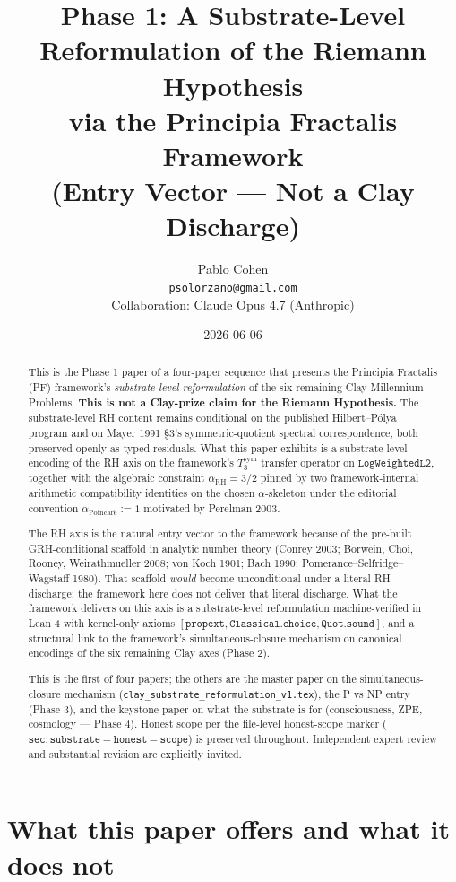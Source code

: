 \documentclass[11pt,a4paper]{article}
\title{Phase 1: A Substrate-Level Reformulation of the
Riemann Hypothesis\\
via the Principia Fractalis Framework\\
\large (Entry Vector --- Not a Clay Discharge)}
\author{Pablo Cohen\\
\small{\texttt{psolorzano@gmail.com}}\\[0.3em]
\small{Collaboration: Claude Opus 4.7 (Anthropic)}}
\date{2026-06-06}
\theoremstyle{plain}
\theoremstyle{definition}
\begin{document}
\maketitle

\begin{abstract}
This is the Phase 1 paper of a four-paper sequence that presents the
Principia Fractalis (PF) framework's \emph{substrate-level
reformulation} of the six remaining Clay Millennium Problems.
\textbf{This is not a Clay-prize claim for the Riemann Hypothesis.}
The substrate-level RH content remains conditional on the published
Hilbert--P\'olya program and on Mayer 1991 \S3's symmetric-quotient
spectral correspondence, both preserved openly as typed residuals.
What this paper exhibits is a substrate-level encoding of the RH axis
on the framework's $T_3^{\mathrm{sym}}$ transfer operator on
$\mathtt{LogWeightedL2}$, together with the algebraic constraint
$\alpha_{\mathrm{RH}} = 3/2$ pinned by two framework-internal arithmetic
compatibility identities on the chosen $\alpha$-skeleton under the
editorial convention $\alpha_{\mathrm{Poincar\acute e}} := 1$ motivated
by Perelman 2003.

The RH axis is the natural entry vector to the framework because of
the pre-built GRH-conditional scaffold in analytic number theory
(Conrey 2003; Borwein, Choi, Rooney, Weirathmueller 2008; von Koch
1901; Bach 1990; Pomerance--Selfridge--Wagstaff 1980). That scaffold
\emph{would} become unconditional under a literal RH discharge; the
framework here does not deliver that literal discharge. What the
framework delivers on this axis is a substrate-level reformulation
machine-verified in Lean 4 with kernel-only axioms
$\mathtt{[propext, Classical.choice, Quot.sound]}$, and a structural
link to the framework's simultaneous-closure mechanism on canonical
encodings of the six remaining Clay axes (Phase 2).

This is the first of four papers; the others are the master paper on
the simultaneous-closure mechanism
(\texttt{clay\_substrate\_reformulation\_v1.tex}), the P vs NP entry
(Phase 3), and the keystone paper on what the substrate is for
(consciousness, ZPE, cosmology --- Phase 4). Honest scope per the
file-level honest-scope marker
($\mathtt{sec:substrate-honest-scope}$) is preserved throughout.
Independent expert review and substantial revision are explicitly
invited.
\end{abstract}

\tableofcontents

\section{What this paper offers and what it does not}
\label{sec:offers}
\end{document}
